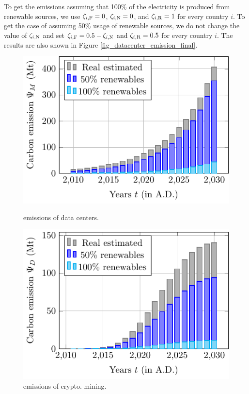 \documentclass[12pt]{article}
\begin{document}
To get the  emissions assuming that 100\% of the electricity is produced from renewable sources, we use $\zeta_{i, \rm F} = 0$, $\zeta_{i, \rm N} = 0$, and $\zeta_{i, \rm R} = 1$ for every country $i$. To get the case of assuming 50\% usage of renewable sources, we do not change the value of $\zeta_{i, \rm N}$ and set $\zeta_{i, \rm F} = 0.5 - \zeta_{i, \rm N}$ and $\zeta_{i, \rm R} = 0.5$ for every country $i$. The results are also shown in Figure \ref{fig_datacenter_emission_final}.

\begin{figure}[!t]
	\centering
	\begin{minipage}{0.48\textwidth}
		\centering
		\includegraphics{figures/trends/datacenter_emission.pdf}
		\caption{ emissions of data centers.}
		\label{fig_datacenter_emission_final}
	\end{minipage}
	\begin{minipage}{0.48\textwidth}
		\centering
		\includegraphics{figures/trends/crypto_emission.pdf}
		\caption{ emissions of crypto. mining.}
		\label{fig_crypto_emission_final}
	\end{minipage}
\end{figure}
\end{document}
